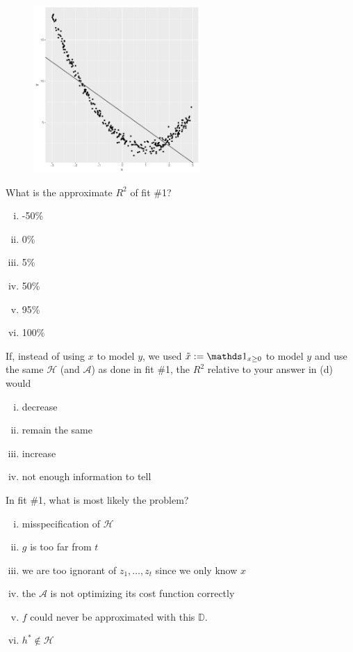 \documentclass[12pt]{article}
\begin{document}
\begin{figure}[htp]
\centering
\includegraphics[width=2.5in]{curvyline}
\end{figure}

  What is the approximate $R^2$ of fit \#1?

\begin{enumerate}[i)]
\item -50\%
\item 0\%
\item 5\%
\item 50\%
\item 95\%
\item 100\%
\end{enumerate}


 If, instead of using $x$ to model $y$, we used $\tilde{x} := \indic{x\geq0}$ to model $y$ and use the same $\mathcal{H}$ (and $\mathcal{A}$) as done in fit \#1, the $R^2$ relative to your answer in (d) would

\begin{enumerate}[i)]
\item decrease
\item remain the same
\item increase
\item not enough information to tell
\end{enumerate}


 In fit \#1, what is most likely the problem?

\begin{enumerate}[i)]
\item misspecification of $\mathcal{H}$
\item $g$ is too far from $t$
\item we are too ignorant of $z_1, \ldots, z_t$ since we only know $x$
\item the $\mathcal{A}$ is not optimizing its cost function correctly
\item $f$ could never be approximated with this $\mathbb{D}$.
\item $h^* \notin \mathcal{H}$
\end{enumerate}
\pagebreak
\end{document}
